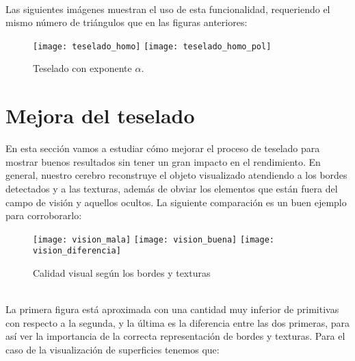 \\Las siguientes imágenes muestran el uso de esta funcionalidad, requeriendo el mismo número de triángulos que en las figuras anteriores:
	\begin{figure}[h]
  		\centering
  		\texttt{[image: teselado\_homo]}
  		\texttt{[image: teselado\_homo\_pol]}
		\caption{Teselado con exponente $\alpha$.}
  		\label{fig:teselado_homo}
	\end{figure}

\section{Mejora del teselado}
	En esta sección vamos a estudiar cómo mejorar el proceso de teselado para mostrar buenos resultados sin tener un gran impacto en el rendimiento. En general, nuestro cerebro reconstruye el objeto visualizado atendiendo a los bordes detectados y a las texturas, además de obviar los elementos que están fuera del campo de visión y aquellos ocultos. La siguiente comparación es un buen ejemplo para corroborarlo:\\
	\begin{figure}[h]
  		\centering
  		\texttt{[image: vision\_mala]}
  		\texttt{[image: vision\_buena]}
  		\texttt{[image: vision\_diferencia]}
  		\caption{Calidad visual según los bordes y texturas}
  		\label{fig:vision_humana}
	\end{figure}
	\\La primera figura está aproximada con una cantidad muy inferior de primitivas con respecto a la segunda, y la última es la diferencia entre las dos primeras, para así ver la importancia de la correcta representación de bordes y texturas. Para el caso de la visualización de superficies tenemos que:
